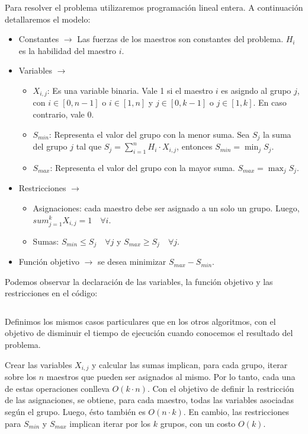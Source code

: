 \documentclass{article}
\begin{document}
Para resolver el problema utilizaremos programación lineal entera. A continuación detallaremos el modelo:
\begin{itemize}
    \item Constantes $\rightarrow$ Las fuerzas de los maestros son constantes del problema. $H_i$ es la habilidad del maestro $i$.
    \item Variables $\rightarrow$
    \begin{itemize}
        \item $X_{i,j}$: Es una variable binaria. Vale 1 si el maestro $i$ es asigndo al grupo $j$, con $i \in [0, n-1]$ o $i \in [1, n]$ y $ j \in [0, k-1]$ o $j \in [1, k]$. En caso contrario, vale 0.
        \item $S_{min}$: Representa el valor del grupo con la menor suma. Sea $S_j$ la suma del grupo $j$ tal que $S_j = \sum_{i=1}^{n} H_i \cdot X_{i,j} $, entonces $S_{min} = \min_j S_j$. 
        \item $S_{max}$: Representa el valor del grupo con la mayor suma. $S_{max} = \max_j S_j$.
    \end{itemize}
    \item Restricciones $\rightarrow$
    \begin{itemize}
        \item Asignaciones: cada maestro debe ser asignado a un solo un grupo. Luego, $sum_{j=1}^{k} X_{i,j} = 1 \quad \forall i$.
        \item Sumas: $S_{min} \leq S_j \quad \forall j$ y $S_{max} \geq S_j \quad \forall j$.
    \end{itemize}
    \item Función objetivo $\rightarrow$ se desea minimizar $S_{max} - S_{min}$.
\end{itemize}

Podemos observar la declaración de las variables, la función objetivo y las restricciones en el código:

\inputminted[linenos, firstline=4]{python}{codigo/programacion_lineal.py}

Definimos los mismos casos particulares que en los otros algoritmos, con el objetivo de disminuir el tiempo de ejecución cuando conocemos el resultado del problema.

Crear las variables $X_{i,j}$ y calcular las sumas implican, para cada grupo, iterar sobre los $n$ maestros que pueden ser asignados al mismo. Por lo tanto, cada una de estas operaciones conlleva $O(k \cdot n)$. Con el objetivo de definir la restricción de las asignaciones, se obtiene, para cada maestro, todas las variables asociadas según el grupo. Luego, ésto también es $O(n \cdot k)$. En cambio, las restricciones para $S_{min}$ y $S_{max}$ implican iterar por los $k$ grupos, con un costo $O(k)$. 
\end{document}
